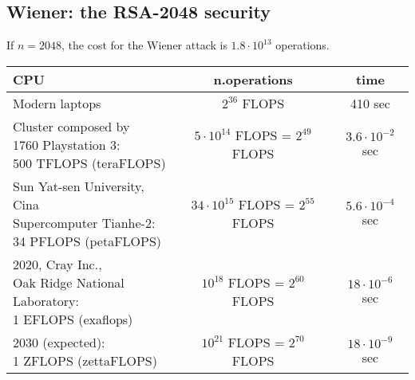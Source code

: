 \documentclass[a4paper, 10pt, titlepage]{article}
\begin{document}
\subsection{Wiener: the RSA-2048 security}
If $n = 2048$, the cost for the Wiener attack is $1.8 \cdot 10^{13}$ operations. \medskip \\
\begin{tabular}{|l|c|c|} \hline
\textbf{CPU} & \textbf{n.operations} & \textbf{time} \\ \hline
Modern laptops & $2^{36}$ FLOPS  & 410 sec \\ \hline
\makecell{Cluster composed by \\
1760 Playstation 3: \\
500 TFLOPS (teraFLOPS)} 
& $5 \cdot 10^{14}$ FLOPS = $2^{49}$ FLOPS & $3.6 \cdot 10^{-2}$ sec \\ \hline
\makecell{Sun Yat-sen University, Cina \\
Supercomputer Tianhe-2:\\
34 PFLOPS (petaFLOPS)}
& $34 \cdot 10^{15}$ FLOPS = $2^{55}$ FLOPS & $5.6 \cdot 10^{-4}$ sec \\ \hline
\makecell{2020, Cray Inc., \\
Oak Ridge National Laboratory: \\
1 EFLOPS (exaflops)} 
& $10^{18}$ FLOPS = $2^{60}$ FLOPS & $18 \cdot 10^{-6}$ sec \\ \hline
\makecell{
2030 (expected): \\
1 ZFLOPS (zettaFLOPS)}
& $10^{21}$ FLOPS = $2^{70}$ FLOPS & $18 \cdot 10^{-9}$ sec \\ \hline
\end{tabular}
\end{document}
